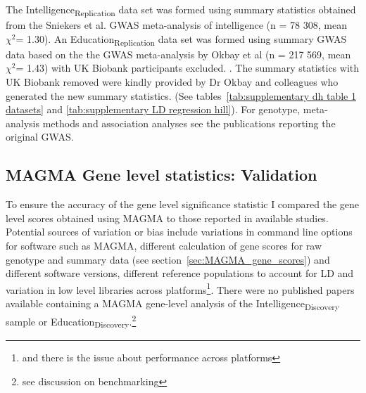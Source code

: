 The Intelligence\textsubscript{Replication} data set was formed using summary statistics obtained from the Sniekers et al. GWAS meta-analysis of intelligence (n = 78 308, mean $\chi^2$= 1.30).  \cite{sniekers2017genome}  An Education\textsubscript{Replication} data set was formed using summary GWAS data based on the the GWAS meta-analysis by Okbay et al (n = 217 569, mean $\chi^2$= 1.43) with UK Biobank participants excluded. \cite{okbay2016genome}. The summary statistics with UK Biobank removed were kindly provided by Dr Okbay and colleagues who generated the new summary statistics.    (See tables~\ref{tab:supplementary dh table 1 datasets} and \ref{tab:supplementary LD regression hill}). 
For genotype, meta-analysis methods and association analyses see the publications reporting the original GWAS\cite{sniekers2017genome}\cite{okbay2016genome}\cite{hill2019combined}.



 




\subsection{MAGMA Gene level statistics: Validation}
\label{sec:MAGMA Gene level statistics validation from other studies}

To ensure the accuracy of the gene level significance statistic I compared the gene level scores obtained using MAGMA to those reported in available studies\cite{de2015magma}. Potential sources of variation or bias include variations in command line options for software such as MAGMA,  different calculation of gene scores for raw genotype and summary data (see section~\ref{sec:MAGMA_gene_scores}) and different software versions, different reference populations to account for LD and variation in low level libraries across platforms\footnote{and there is the issue about performance across platforms}.\cite{kim2018experimenting} There were no published papers available containing a MAGMA gene-level analysis of the Intelligence\textsubscript{Discovery} sample or Education\textsubscript{Discovery}.\footnote{see discussion on benchmarking} 


